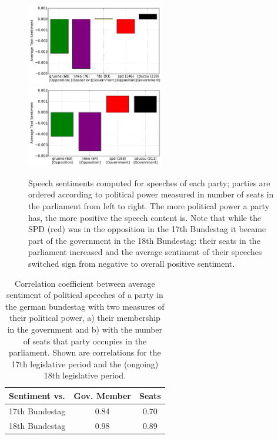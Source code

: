 \documentclass[runningheads,a4paper]{llncs}
\begin{document}
\begin{figure}
\begin{center}
\includegraphics[width=6cm]{images/party-sentiments-17.pdf}  \hfill \includegraphics[width=6cm]{images/party-sentiments-18.pdf} 
%
\end{center}
\caption{
\label{fig:party_sentiments}
Speech sentiments computed for speeches of each party; parties are ordered according to political power measured in number of seats in the parliament from left to right. The more political power a party has, the more positive the speech content is. Note that while the SPD (red) was in the opposition in the 17th Bundestag it became part of the government in the 18th Bundestag: their seats in the parliament increased and the average sentiment of their speeches switched sign from negative to overall positive sentiment.
}
\end{figure}

\begin{table}[t]
\begin{center}
\begin{tabular}{lcc}
   Sentiment vs. &          Gov. Member    &  Seats\\
\hline\hline
17th Bundestag    &  0.84 & 0.70\\
18th Bundestag   &  0.98 & 0.89\\
%
\end{tabular}
\end{center}
\caption{
\label{tab:results_avg_political_view}
Correlation coefficient between average sentiment of political speeches of a party in the german bundestag with two measures of their political power, a) their membership in the government and b) with the number of seats that party occupies in the parliament. Shown are correlations for the 17th legislative period and the (ongoing) 18th legislative period.
}
\end{table}
\end{document}
